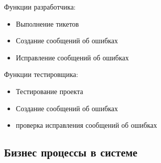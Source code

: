 Функции разработчика:
\begin{itemize}
\item Выполнение тикетов
\item Создание сообщений об ошибках
\item Исправление сообщений об ошибках
\end{itemize}

Функции тестировщика:
\begin{itemize}
\item Тестирование проекта
\item Создание сообщений об ошибках
\item проверка исправления сообщений об ошибках
\end{itemize}

\subsection{Бизнес процессы в системе}
